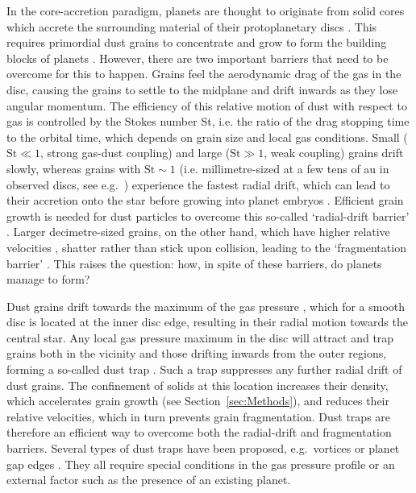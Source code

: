 \documentclass[a4paper,fleqn,usenatbib]{mnras}
\newcommand{\St}{\mathrm{St}}         %
\begin{document}
In the core-accretion paradigm, planets are thought to originate from solid cores which accrete the surrounding material of their protoplanetary discs \citep{Lissauer1993,Pollack1996,Alibert2005,Mordasini2012}. This requires primordial dust grains to concentrate and grow to form the building blocks of planets \citep{Dominik2007}. However, there are two important barriers that need to be overcome for this to happen. Grains feel the aerodynamic drag of the gas in the disc, causing the grains to settle to the midplane and drift inwards as they lose angular momentum. The efficiency of this relative motion of dust with respect to gas is controlled by the Stokes number St, i.e. the ratio of the drag stopping time to the orbital time, which depends on grain size and local gas conditions. Small ($\St\ll1$, strong gas-dust coupling) and large ($\St\gg1$, weak coupling) grains drift slowly, whereas grains with $\mathrm{St}\sim1$ (i.e. millimetre-sized at a few tens of au in observed discs, see e.g.\ \citealt{Laibe2012,Dipierro2015}) experience the fastest radial drift, which can lead to their accretion onto the star before growing into planet embryos \citep{Adachi1976,Weidenschilling1977}. Efficient grain growth is needed for dust particles to overcome this so-called `radial-drift barrier' \citep{LGM2014}. Larger decimetre-sized grains, on the other hand, which have higher relative velocities \citep{WC1993}, shatter rather than stick upon collision, leading to the `fragmentation barrier' \citep{Blum2008}. This raises the question: how, in spite of these barriers, do planets manage to form?

Dust grains drift towards the maximum of the gas pressure \citep{Weidenschilling1977}, which for a smooth disc is located at the inner disc edge, resulting in their radial motion towards the central star. Any local gas pressure maximum in the disc will attract and trap grains both in the vicinity and those drifting inwards from the outer regions, forming a so-called dust trap \citep{Whipple1972}. Such a trap suppresses any further radial drift of dust grains. The confinement of solids at this location increases their density, which accelerates grain growth (see Section~\ref{sec:Methods}), and reduces their relative velocities, which in turn prevents grain fragmentation. Dust traps are therefore an efficient way to overcome both the radial-drift and fragmentation barriers. Several types of dust traps have been proposed, e.g.\ vortices \citep{Barge1995,Regaly2012,Meheut2012,Lyra2012,Zhu2014} or planet gap edges \citep{Paardekooper2004,Paardekooper2006,Rice2006,Fouchet2007,Fouchet2010,Ayliffe2012,Pinilla2012,Zhu2012,Zhu2014}. They all require special conditions in the gas pressure profile or an external factor such as the presence of an existing planet.
\end{document}
